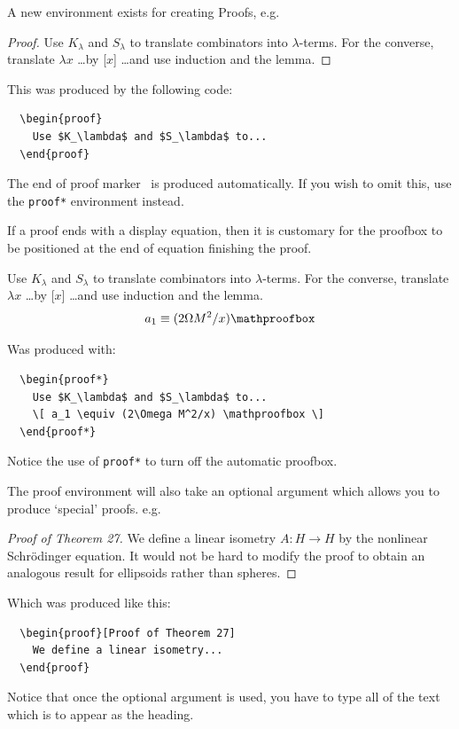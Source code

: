 \documentclass{article}
\begin{document}
A new environment exists for creating Proofs, e.g.
%
\begin{proof}
  Use $K_\lambda$ and $S_\lambda$ to translate combinators
  into $\lambda$-terms. For the converse, translate
  $\lambda x$ \ldots by [$x$] \ldots and use induction
  and the lemma.
\end{proof}
%
This was produced by the following code:
%
\begin{verbatim}
  \begin{proof}
    Use $K_\lambda$ and $S_\lambda$ to...
  \end{proof}
\end{verbatim}
%
The end of proof marker \proofbox\ is produced automatically. If you wish
to omit this, use the \verb"proof*" environment instead.

If a proof ends with a display equation, then it is customary for the proofbox
to be positioned at the end of equation finishing the proof. \eg
%
\begin{proof*}
  Use $K_\lambda$ and $S_\lambda$ to translate combinators
  into $\lambda$-terms. For the converse, translate
  $\lambda x$ \ldots by [$x$] \ldots and use induction
  and the lemma.
  \[ a_1 \equiv (2\Omega M^2/x) \mathproofbox \]
\end{proof*}
%
Was produced with:
%
\begin{verbatim}
  \begin{proof*}
    Use $K_\lambda$ and $S_\lambda$ to...
    \[ a_1 \equiv (2\Omega M^2/x) \mathproofbox \]
  \end{proof*}
\end{verbatim}
%
Notice the use of \verb"proof*" to turn off the automatic proofbox.

The proof environment will also take an optional argument which allows you
to produce `special' proofs. e.g.
%
\begin{proof}[Proof of Theorem 27]
  We define a linear isometry $A:H\rightarrow H$ by the nonlinear
  Schr\"{o}dinger equation. It would not be hard to modify the
  proof to obtain an analogous result for ellipsoids rather than
  spheres.
\end{proof}
%
Which was produced like this:
%
\begin{verbatim}
  \begin{proof}[Proof of Theorem 27]
    We define a linear isometry...
  \end{proof}
\end{verbatim}
%
Notice that once the optional argument is used, you have to type all of
the text which is to appear as the heading.
\end{document}

